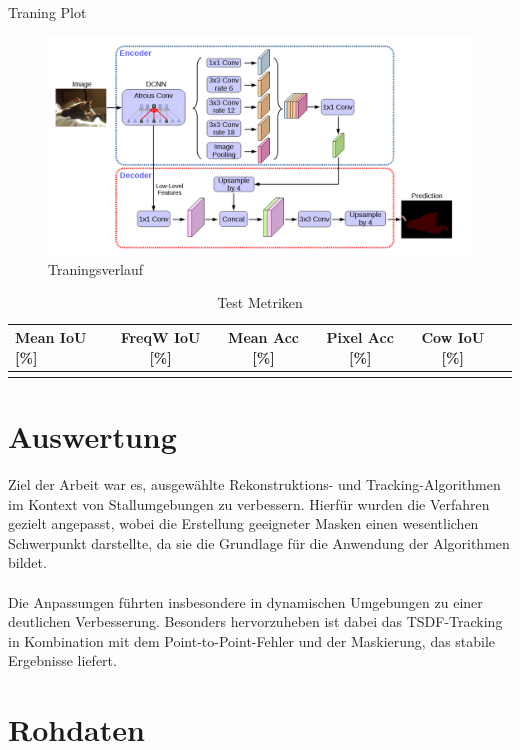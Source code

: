 \documentclass[12pt,DIV=15,BCOR=15mm,twoside,headsepline,abstract=true,listof=totoc,bibliography=totoc]{scrreprt}
\theoremstyle{remark}    %
\begin{document}
    Traning Plot
    \begin{figure}[ht]
        \centering
        \includegraphics[width=0.1\linewidth]{pics/Arc.png}
        \caption{Traningsverlauf}
    \end{figure}
    
    \begin{table}[ht]
        \centering
        \caption{Test Metriken }
        \label{tab:test_results}
        \setlength{\tabcolsep}{5pt} 
        \renewcommand{\arraystretch}{1.3}
        \begin{tabular}{l*{5}{c}}
            \toprule
            \textbf{Mean IoU [\%]} & \textbf{FreqW IoU [\%]} & \textbf{Mean Acc [\%]} & \textbf{Pixel Acc [\%]} & \textbf{Cow IoU [\%]}\\
            \midrule
            &&&&&\\
            \bottomrule
        \end{tabular}
    \end{table}


    \chapter{Auswertung}
    Ziel der Arbeit war es, ausgewählte Rekonstruktions- und Tracking-Algorithmen im Kontext von Stallumgebungen zu verbessern. 
    Hierfür wurden die Verfahren gezielt angepasst, wobei die Erstellung geeigneter Masken einen wesentlichen Schwerpunkt darstellte, 
    da sie die Grundlage für die Anwendung der Algorithmen bildet.\\\\
    Die Anpassungen führten insbesondere in dynamischen Umgebungen zu einer deutlichen Verbesserung. Besonders hervorzuheben ist dabei 
    das TSDF-Tracking in Kombination mit dem Point-to-Point-Fehler und der Maskierung, das stabile Ergebnisse liefert.

    \clearpage
    \appendix

    \chapter{Rohdaten}
\end{document}
